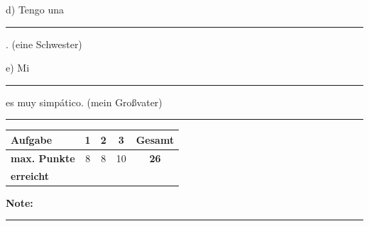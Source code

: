 \documentclass[11pt, a4paper]{article}
\newcommand{\luecke}[1]{\rule{#1}{0.4pt}}
\begin{document}
\vspace{0.8em}

\noindent
d) Tengo una \luecke{3cm}. \hfill (eine Schwester)

\vspace{0.8em}

\noindent
e) Mi \luecke{3cm} es muy simpático. \hfill (mein Großvater)


\vspace{25pt}
\hrule
\vspace{10pt}

\noindent
\begin{tabularx}{\textwidth}{|X|c|c|c||c|}
\hline
\textbf{Aufgabe} & 1 & 2 & 3 & \textbf{Gesamt} \\
\hline
\textbf{max. Punkte} & 8 & 8 & 10 & \textbf{26} \\
\hline
\textbf{erreicht} & & & & \\[0.8em]
\hline
\end{tabularx}

\vspace{10pt}

\begin{flushright}
\textbf{Note:} \luecke{2cm}
\end{flushright}
\end{document}
